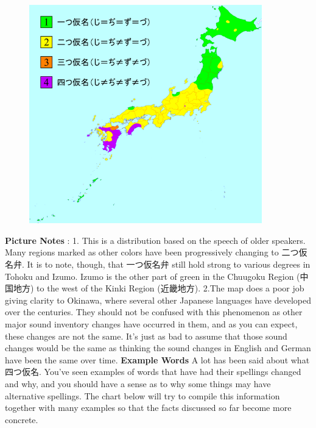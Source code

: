 \begin{figure}[h]
\centering

\includegraphics[width=0.9\textwidth]{figs/第08章/第356課:_yotsugana_fig/639px_Yotsugana.png}

\end{figure}
\hfill\break
\textbf{Picture Notes }: 1. This is a distribution based on the speech of older speakers. Many regions marked as other colors have been progressively changing to 二つ仮名弁. It is to note, though, that 一つ仮名弁 still hold strong to various degrees in Tohoku and Izumo. Izumo is the other part of green in the Chuugoku Region (中国地方) to the west of the Kinki Region (近畿地方).  2.The map does a poor job giving clarity to Okinawa, where several other Japanese languages have developed over the centuries. They should not be confused with this phenomenon as other major sound inventory changes have occurred in them, and as you can expect, these changes are not the same. It's just as bad to assume that those sound changes would be the same as thinking the sound changes in English and German have been the same over time.  \textbf{Example Words }  A lot has been said about what 四つ仮名. You've seen examples of words that have had their spellings changed and why, and you should have a sense as to why some things may have alternative spellings. The chart below will try to compile this information together with many examples so that the facts discussed so far become more concrete.  
